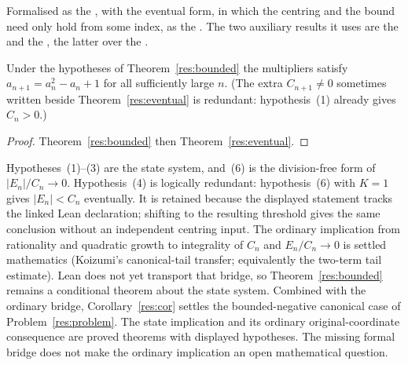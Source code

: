 \documentclass[11pt]{article}
\begin{document}
\noindent Formalised as the
, with the eventual form, in which the centring and the bound need
only hold from some index, as the
.  The two auxiliary results it uses are the
 and the
, the latter over the
.

\begin{corollary}\label{res:cor}
Under the hypotheses of Theorem~\ref{res:bounded} the multipliers satisfy
$a_{n+1}=a_n^{2}-a_n+1$ for all sufficiently large $n$.
(The extra $C_{n+1}\ne0$ sometimes written beside Theorem~\ref{res:eventual}
is redundant: hypothesis~(1) already gives $C_n>0$.)
\end{corollary}

\begin{proof}
Theorem~\ref{res:bounded} then Theorem~\ref{res:eventual}.
\end{proof}

Hypotheses~(1)--(3) are the state system, and~(6) is the division-free form of
$|E_n|/C_n\to0$.  Hypothesis~(4) is logically redundant: hypothesis~(6) with
$K=1$ gives $|E_n|<C_n$ eventually.  It is retained because the displayed
statement tracks the linked Lean declaration; shifting to the resulting
threshold gives the same conclusion without an independent centring input.
The ordinary implication from rationality and quadratic growth to integrality
of $C_n$ and $E_n/C_n\to0$ is settled mathematics (Koizumi's canonical-tail
transfer; equivalently the two-term tail estimate).  Lean does not yet
transport that bridge, so Theorem~\ref{res:bounded} remains a conditional
theorem about the state system.  Combined with the ordinary bridge,
Corollary~\ref{res:cor} settles the bounded-negative canonical case of
Problem~\ref{res:problem}.  The state implication and its ordinary original-coordinate consequence are
proved theorems with displayed hypotheses.  The missing formal bridge does
not make the ordinary implication an open mathematical question.
\end{document}
